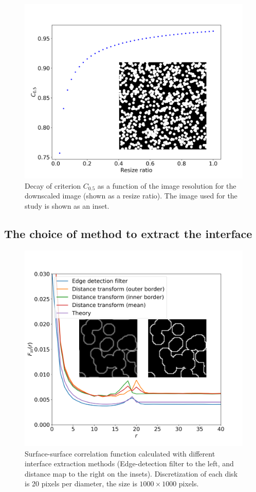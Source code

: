 \documentclass[reprint,amsmath,amssymb,aps,pre,showkeys,showpacs]{revtex4-1}
\begin{document}
\begin{figure}[ht]
  \centering
  \includegraphics[width=\linewidth]{images/plot-criterion1.png}
  \caption[]{Decay of criterion $C_{0.5}$ as a function of the image resolution
    for the downscaled image (shown as a resize ratio). The image used for the
    study is shown as an inset.}
  \label{fig:crit-plot}
\end{figure}

\subsection{The choice of method to extract the interface}
\begin{figure}[ht]
  \centering
  \includegraphics[width=\linewidth]{images/dm_sobel.png}
  \caption{Surface-surface correlation function calculated with different
    interface extraction methods (Edge-detection filter to the left, and
    distance map to the right on the insets). Discretization of each disk is 20
    pixels per diameter, the size is $1000 \times 1000$ pixels.}
  \label{fig:interface-extraction}
\end{figure}
\end{document}
